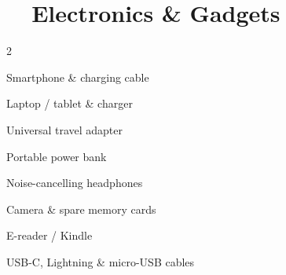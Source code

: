 \section{\faLaptop\ \ Electronics \& Gadgets}

\begin{multicols}{2}
\begin{checklist}
  \item Smartphone \& charging cable
  \item Laptop / tablet \& charger
  \item Universal travel adapter
  \item Portable power bank
  \item Noise-cancelling headphones
  \item Camera \& spare memory cards
  \item E-reader / Kindle
  \item USB-C, Lightning \& micro-USB cables
\end{checklist}
\end{multicols}

